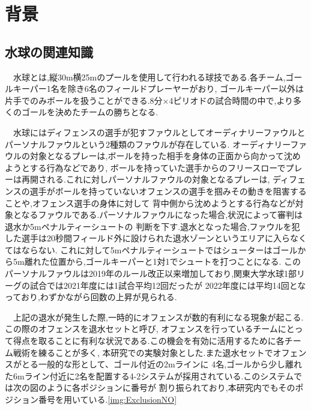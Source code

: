 \documentclass[../main.tex]{subfiles}
\begin{document}
\chapter{背景}

\section{水球の関連知識}
\par　水球とは,縦30m横25mのプールを使用して行われる球技である.各チーム,ゴールキーパー1名を除き6名のフィールドプレーヤーがおり,
ゴールキーパー以外は片手でのみボールを扱うことができる.8分×4ピリオドの試合時間の中で,より多くのゴールを決めたチームの勝ちとなる.

\par　水球にはディフェンスの選手が犯すファウルとしてオーディナリーファウルとパーソナルファウルという2種類のファウルが存在している.
オーディナリーファウルの対象となるプレーは,ボールを持った相手を身体の正面から向かって沈めようとする行為などであり,
ボールを持っていた選手からのフリースローでプレーは再開される.これに対しパーソナルファウルの対象となるプレーは,
ディフェンスの選手がボールを持っていないオフェンスの選手を掴みその動きを阻害することや,オフェンス選手の身体に対して
背中側から沈めようとする行為などが対象となるファウルである.パーソナルファウルになった場合,状況によって審判は退水か5mペナルティーシュートの
判断を下す.退水となった場合,ファウルを犯した選手は20秒間フィールド外に設けられた退水ゾーンというエリアに入らなくてはならない.
これに対して5mペナルティーシュートではシューターはゴールから5m離れた位置から,ゴールキーパーと1対1でシュートを打つことになる.
このパーソナルファウルは2019年のルール改正以来増加しており,関東大学水球1部リーグの試合では2021年度には1試合平均12回だったが
2022年度には平均14回となっており,わずかながら回数の上昇が見られる.

\par　上記の退水が発生した際,一時的にオフェンスが数的有利になる現象が起こる.この際のオフェンスを退水セットと呼び,
オフェンスを行っているチームにとって得点を取ることに有利な状況である.この機会を有効に活用するために各チーム戦術を練ることが多く,
本研究での実験対象とした.また退水セットでオフェンスがとる一般的な形として、ゴール付近の2mラインに
4名,ゴールから少し離れた6mライン付近に2名を配置する4-2システムが採用されている.このシステムでは次の図のように各ポジションに番号が
割り振られており,本研究内でもそのポジション番号を用いている.\ref{img:ExclusionNO}
\end{document}
